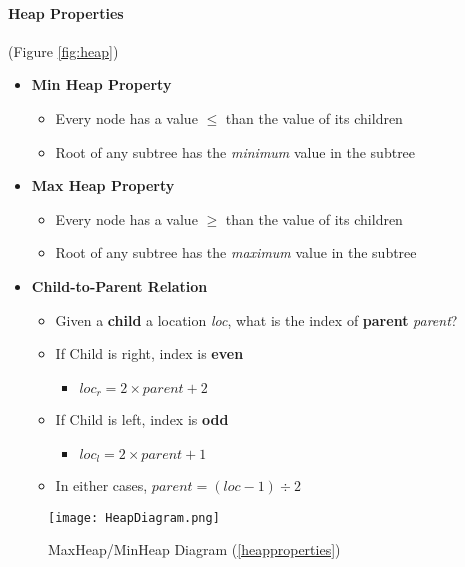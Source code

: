 \documentclass[10pt, 
a4paper, 
oneside, 
headinclude, footinclude, 
BCOR5mm]
{scrartcl}
\begin{document}
\paragraph{\textbf{Heap Properties}} (Figure \vref{fig:heap})
\label{heapproperties}
\begin{itemize}
    \item \textbf{Min Heap Property} 
    \begin{itemize}
        \item Every node has a value $\leq$ than the value of its children
        \item Root of any subtree has the \textit{minimum} value in the subtree    
    \end{itemize}
    \item \textbf{Max Heap Property}
    \begin{itemize}
        \item Every node has a value $\geq$ than the value of its children
        \item Root of any subtree has the \textit{maximum} value in the subtree
    \end{itemize}
    \item \textbf{Child-to-Parent Relation}
    \begin{itemize}
        \item Given a \textbf{child} a location \textit{loc}, what is the index of \textbf{parent} \textit{parent}?
        \item If Child is right, index is \textbf{even}
        \begin{itemize}
            \item $loc_r = 2 \times parent + 2$
        \end{itemize} 
        \item If Child is left, index is \textbf{odd}
        \begin{itemize}
            \item $loc_l = 2 \times parent + 1$
        \end{itemize}
        \item In either cases, $parent = (loc - 1) \div 2$
    \end{itemize}
\end{itemize}
\begin{figure}[H]
    \begin{center}
        \texttt{[image: HeapDiagram.png]}
        \caption{MaxHeap/MinHeap Diagram (\vref{heapproperties})}
        \label{fig:heap}
    \end{center}
\end{figure}
\end{document}
